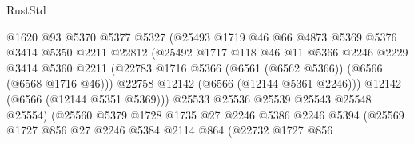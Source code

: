 \begin{lexlean}{RustStd}
\begin{coremodule}
                                @1620
                                @93
                                @5370
                                @5377
                                @5327
                                (@25493
                                  @1719
                                  @46
                                  @66
                                  @4873
                                  @5369
                                  @5376
                                  @3414
                                  @5350
                                  @2211
                                  @22812
                                  (@25492
                                    @1717
                                    @118
                                    @46
                                    @11
                                    @5366
                                    @2246
                                    @2229
                                    @3414
                                    @5360
                                    @2211
                                    (@22783
                                      @1716
                                      @5366
                                      (@6561 (@6562 @5366))
                                      (@6566 (@6568 @1716 @46)))
                                    @22758
                                    @12142
                                    (@6566 (@12144 @5361 @2246)))
                                  @12142
                                  (@6566 (@12144 @5351 @5369)))
                                @25533
                                @25536
                                @25539
                                @25543
                                @25548
                                @25554)
                              (@25560
                                @5379
                                @1728
                                @1735
                                @27
                                @2246
                                @5386
                                @2246
                                @5394
                                (@25569
                                  @1727
                                  @856
                                  @27
                                  @2246
                                  @5384
                                  @2114
                                  @864
                                  (@22732
                                    @1727
                                    @856

\end{coremodule}
\end{lexlean}
